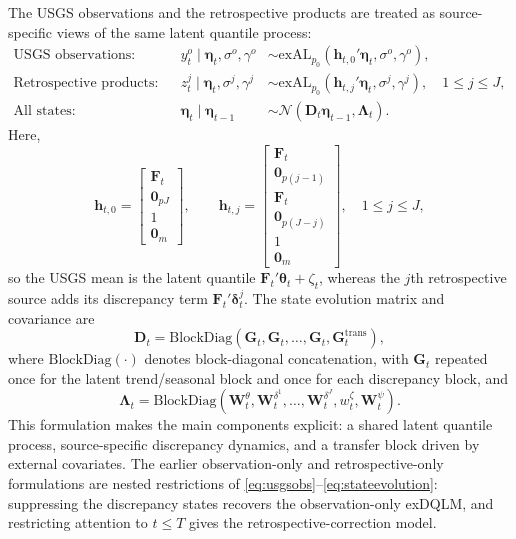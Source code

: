 \documentclass[APA,STIX1COL]{WileyNJD-v2}
\begin{document}
The USGS observations and the retrospective products are treated as source-specific views of the same latent quantile process:
\begin{align}
     \text{USGS observations}:&& y^o_t \mid \boldsymbol{\eta}_t, \sigma^o, \gamma^o &\sim \text{exAL}_{p_0}\!\left(\mathbf{h}_{t,0}' \boldsymbol{\eta}_t, \sigma^o, \gamma^o\right), \label{eq:usgsobs} \\
    \text{Retrospective products}:&& z^j_t \mid \boldsymbol{\eta}_t, \sigma^j, \gamma^j &\sim \text{exAL}_{p_0}\!\left(\mathbf{h}_{t,j}' \boldsymbol{\eta}_t, \sigma^j, \gamma^j\right), \quad 1 \leq j \leq J, \label{eq:retroobs} \\
    \text{All states}:&& \boldsymbol{\eta}_t \mid \boldsymbol{\eta}_{t-1} &\sim \mathcal{N}\!\left(\boldsymbol{D}_t \boldsymbol{\eta}_{t-1}, \boldsymbol{\Lambda}_t\right). \label{eq:stateevolution}
\end{align}
Here,
\[
\mathbf{h}_{t,0} =
\begin{bmatrix}
\mathbf{F}_t \\
\mathbf{0}_{pJ} \\
1 \\
\mathbf{0}_m
\end{bmatrix},
\qquad
\mathbf{h}_{t,j} =
\begin{bmatrix}
\mathbf{F}_t \\
\mathbf{0}_{p(j-1)} \\
\mathbf{F}_t \\
\mathbf{0}_{p(J-j)} \\
1 \\
\mathbf{0}_m
\end{bmatrix},
\quad 1 \le j \le J,
\]
so the USGS mean is the latent quantile \(\mathbf{F}_t' \boldsymbol{\theta}_t + \zeta_t\), whereas the \(j\)th retrospective source adds its discrepancy term \(\mathbf{F}_t' \boldsymbol{\delta}_t^j\). The state evolution matrix and covariance are
\[
\boldsymbol{D}_t = \text{BlockDiag}\!\left(\mathbf{G}_t, \mathbf{G}_t, \ldots, \mathbf{G}_t, \mathbf{G}^{\text{trans}}_t\right),
\]
where \(\text{BlockDiag}(\cdot)\) denotes block-diagonal concatenation, with \(\mathbf{G}_t\) repeated once for the latent trend/seasonal block and once for each discrepancy block, and
\[
\boldsymbol{\Lambda}_t = \text{BlockDiag}\!\left(\mathbf{W}^{\theta}_t, \mathbf{W}^{\delta^1}_t, \ldots, \mathbf{W}^{\delta^J}_t, w_t^{\zeta}, \mathbf{W}^{\psi}_t\right).
\]
This formulation makes the main components explicit: a shared latent quantile process, source-specific discrepancy dynamics, and a transfer block driven by external covariates. The earlier observation-only and retrospective-only formulations are nested restrictions of \eqref{eq:usgsobs}--\eqref{eq:stateevolution}: suppressing the discrepancy states recovers the observation-only exDQLM, and restricting attention to \(t \leq T\) gives the retrospective-correction model.
\end{document}
